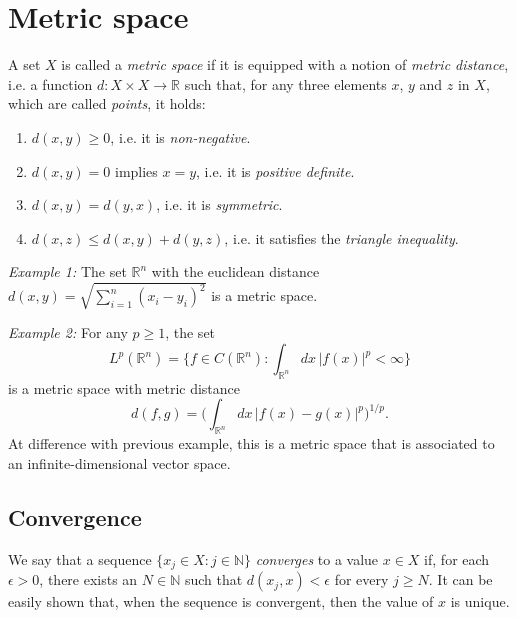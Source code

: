 \documentclass[aps,prl,twocolumn,groupedaddress]{revtex4-2}
\newcommand{\NN}{\mathbb{N}}
\newcommand{\RR}{\mathbb{R}}
\begin{document}
\maketitle
\onecolumngrid

\section{Metric space}

A set $X$ is called a {\em metric space} if it is equipped with a notion of {\em metric distance}, i.e. a function $d:X\times X\to \RR$ such that, for any three elements $x$, $y$ and $z$ in $X$, which are called {\em points}, it holds:
\begin{enumerate}
\item $d(x,y) \geq 0$, i.e. it is {\em non-negative}.
\item $d(x,y) = 0$ implies $x=y$, i.e. it is {\em positive definite}.
\item $d(x,y) = d(y,x)$, i.e. it is {\em symmetric}.
\item $d(x,z) \leq  d(x,y) + d(y,z)$, i.e. it satisfies the {\em triangle inequality}.
\end{enumerate}

{\em Example 1:} The set $\RR^n$ with the euclidean distance $d(x,y) = \sqrt{\sum_{i=1}^n (x_i-y_i)^2}$ is a metric space.

{\em Example 2:}
For any $p\geq 1$, the set 
$$
L^p(\RR^n)
=
\bigg\{
f\in C(\RR^n)
:
\int_{\RR^n}
dx\,
|f(x)|^p
<
\infty
\bigg\}
$$
is a metric space with metric distance
$$
d(f,g)
=
\bigg(
\int_{\RR^n}
dx\,
|f(x)-g(x)|^p
\bigg)^{1/p}
.
$$
At difference with previous example, this is a metric space that is associated to an infinite-dimensional vector space.

\subsection{Convergence}

We say that a sequence $\{x_j\in X:j\in \NN\}$ {\em converges} to a value $x\in X$ if, for each $\epsilon>0$, there exists an $N\in \NN$ such that $d(x_j,x)<\epsilon$ for every $j\geq N$.
It can be easily shown that, when the sequence is convergent, then the value of $x$ is unique.
\end{document}
